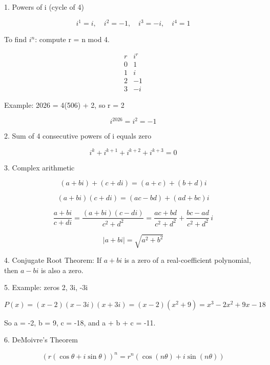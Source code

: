 1. Powers of i (cycle of 4)

$$ i^1 = i, \quad i^2 = -1, \quad i^3 = -i, \quad i^4 = 1 $$

To find $i^n$: compute r = n mod 4.

$$ \begin{array}{c|c}
r & i^r \\
0 & 1 \\
1 & i \\
2 & -1 \\
3 & -i
\end{array} $$

Example: 2026 = 4(506) + 2, so r = 2

$$ i^{2026} = i^2 = -1 $$

2. Sum of 4 consecutive powers of i equals zero

$$ i^k + i^{k+1} + i^{k+2} + i^{k+3} = 0 $$

3. Complex arithmetic

$$ (a + bi) + (c + di) = (a+c) + (b+d)i $$

$$ (a + bi)(c + di) = (ac - bd) + (ad + bc)i $$

$$ \frac{a + bi}{c + di} = \frac{(a+bi)(c-di)}{c^2 + d^2} = \frac{ac+bd}{c^2+d^2} + \frac{bc-ad}{c^2+d^2} \, i $$

$$ |a + bi| = \sqrt{a^2 + b^2} $$

4. Conjugate Root Theorem: If $a + bi$ is a zero of a real-coefficient polynomial, then $a - bi$ is also a zero.

5. Example: zeros 2, 3i, -3i

$$ P(x) = (x-2)(x-3i)(x+3i) = (x-2)(x^2+9) = x^3 - 2x^2 + 9x - 18 $$

So a = -2, b = 9, c = -18, and a + b + c = -11.

6. DeMoivre's Theorem

$$ \left( r(\cos\theta + i\sin\theta) \right)^n = r^n \left( \cos(n\theta) + i\sin(n\theta) \right) $$
